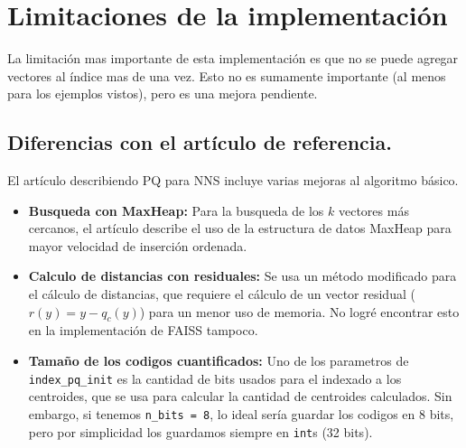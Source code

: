 \section{Limitaciones de la implementaci\'on}

La limitaci\'on mas importante de esta implementaci\'on es que no se puede 
agregar vectores al \'indice mas de una vez. Esto no es sumamente importante 
(al menos para los ejemplos vistos), pero es una mejora pendiente.

\subsection*{Diferencias con el art\'iculo de referencia\cite{pqnns}.}

El art\'iculo describiendo PQ para NNS\cite{pqnns} incluye varias mejoras al 
algoritmo b\'asico.

\begin{itemize}
  \item\textbf{Busqueda con MaxHeap:} 
    Para la busqueda de los $k$ vectores m\'as cercanos, el art\'iculo describe
    el uso de la estructura de datos MaxHeap para mayor velocidad de
    inserci\'on ordenada.
  \item\textbf{Calculo de distancias con residuales:} 
    Se usa un m\'etodo modificado para el c\'alculo de distancias, que requiere 
    el c\'alculo de un vector residual (\(r(y) = y - q_c(y)\)) para un menor uso 
    de memoria. No logr\'e encontrar esto en la implementaci\'on de FAISS 
    tampoco.
  \item\textbf{Tama\~no de los codigos cuantificados:} 
    Uno de los parametros de \texttt{index\_pq\_init} es la cantidad de bits 
    usados para el indexado a los centroides, que se usa para calcular la 
    cantidad de centroides calculados. Sin embargo, si tenemos \texttt{n\_bits = 
    8}, lo ideal ser\'ia guardar los codigos en 8 bits, pero por simplicidad los 
    guardamos siempre en \texttt{int}s (32 bits).
\end{itemize}
